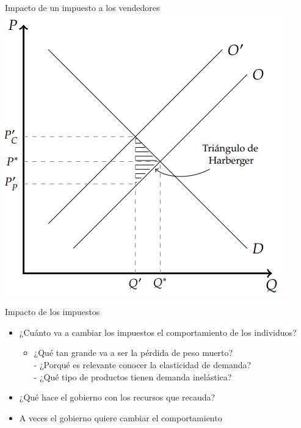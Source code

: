 \documentclass{beamer}
\begin{document}
\begin{frame}{Impacto de un impuesto a los vendedores}
    \centering
    \includegraphics[scale=0.7]{../Figures/C24.1.png}
\end{frame}

\begin{frame}{Impacto de los impuestos}
    \begin{itemize}
        \item ¿Cuánto va a cambiar los impuestos el comportamiento de los individuos?
        \begin{itemize}
            \item ¿Qué tan grande va a ser la pérdida de peso muerto? \\
            - ¿Porqué es relevante conocer la elasticidad de demanda? \\
            - ¿Qué tipo de productos tienen demanda inelástica?
        \end{itemize}
        \item ¿Qué hace el gobierno con los recursos que recauda?
        \item A veces el gobierno quiere cambiar el comportamiento
    \end{itemize}
\end{frame}
\end{document}
